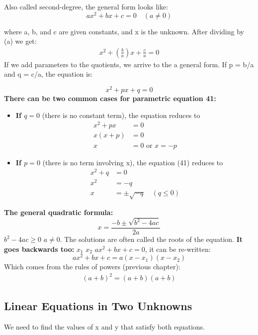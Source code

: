 \documentclass{article}
\begin{document}
Also called second-degree, the general form looks like: 
\begin{equation}
ax^2 + bx + c = 0 \quad (a \neq 0)
\end{equation}

where a, b, and c are given constants, and x is the unknown. After dividing by (a) we get: 
\begin{align*}
x^2 + \left(\frac{b}{a}\right)x + \frac{c}{a} = 0
\end{align*}
If we add parameters to the quotients, we arrive to the a general form. If p = b/a and q = c/a, the equation is:

\begin{equation}
x^2 + px + q = 0
\end{equation}
\textbf{There can be two common cases for parametric equation 41:}

\begin{itemize}
\item \textbf{If $q = 0$} (there is no constant term), the equation reduces to 
\begin{align*}
x^2 + px &= 0 \\
x(x + p) &= 0 \\
x &= 0 \text{ or } x = -p
\end{align*}

\item  \textbf{If $p = 0$} (there is no term involving x), the equation (41) reduces to
\begin{align*}
x^2 + q &= 0 \\
x^2 &= -q \\
x &= \pm \sqrt{-q} \quad (q \leq 0)
\end{align*}
\end{itemize}
\textbf{The general quadratic formula: }
\begin{equation}
x = \frac{-b \pm \sqrt{b^2 - 4ac}}{2a}
\end{equation}
 $b^2 - 4ac \geq 0$  $a \neq 0$. The solutions are often called the roots of the equation. \textbf{ It goes backwards too:}  $x_1$  $x_2$  $ax^2 + bx + c = 0$, it can be re-written:
\begin{equation}
ax^2 + bx + c = a(x - x_1)(x - x_2)
\end{equation}
Which comes from the rules of powers (previous chapter):
\begin{align*}
(a+b)^2 = (a+b)(a+b)
\end{align*}
\subsection{Linear Equations in Two Unknowns}
We need to find the values of x and y that satisfy both equations. \\
\end{document}
